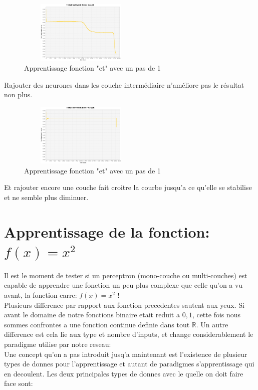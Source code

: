 \documentclass[twoside,openright,a4paper,11pt,french]{article}
\begin{document}
\begin{figure}[ht]
\centering
\includegraphics[width=6cm,height=3cm]{./pics/eq/multi_3_4_def.eps}
\caption{Apprentissage fonction "et" avec un pas de 1}
\end{figure}
\clearpage

Rajouter des neurones dans les couche intermédiaire n'améliore pas le résultat
non plus.

\begin{figure}[ht]
\centering
\includegraphics[width=6cm,height=3cm]{./pics/eq/multi_3_3_3_def.eps}
\caption{Apprentissage fonction "et" avec un pas de 1}
\end{figure}


Et rajouter encore une couche fait croitre la courbe jusqu'a ce qu'elle se
stabilise et ne semble plus diminuer.


\section{Apprentissage de la fonction: $f(x) = x^2$}

Il est le moment de tester si un perceptron (mono-couche ou multi-couches) est
capable de apprendre une fonction un peu plus complexe que celle qu'on a vu avant, 
la fonction carre: $f(x) = x^2$ !\\

Plusieurs difference par rapport aux fonction precedentes sautent aux yeux.
Si avant le domaine de notre fonctions binaire etait reduit a ${0,1}$, cette
fois nous sommes confrontes a une fonction continue definie dans tout $\mathbb{R}$.
Un autre difference est cela lie aux type et nombre d'inputs, et change
considerablement le paradigme utilise par notre reseau:\\

Une concept qu'on a pas introduit jusq'a maintenant est l'existence de plusieur
types de donnes pour l'apprentissage et autant de paradigmes s'apprentissage qui en
decoulent. Les deux principales types de donnes avec le quelle on doit faire
face sont:
\end{document}
